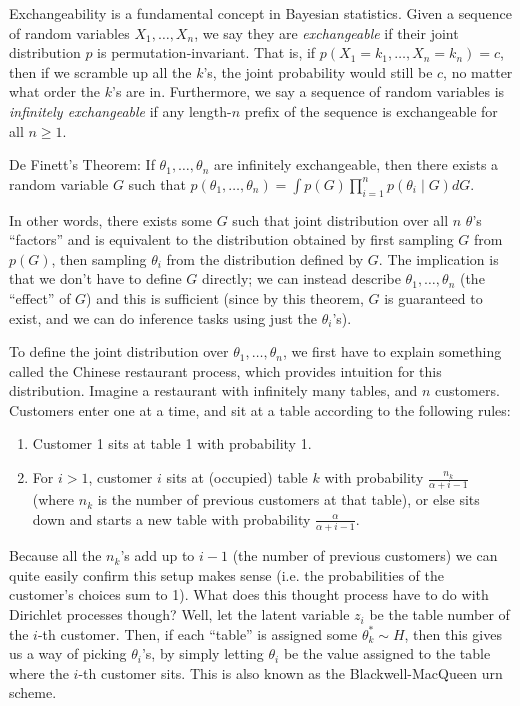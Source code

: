 Exchangeability is a fundamental concept in Bayesian statistics. Given a sequence of random variables $X_1, \ldots, X_n$, we say they are \textit{exchangeable} if their joint distribution $p$ is permutation-invariant. That is, if $p(X_1 = k_1, \ldots, X_n = k_n) = c$, then if we scramble up all the $k$'s, the joint probability would still be $c$, no matter what order the $k$'s are in. Furthermore, we say a sequence of random variables is \textit{infinitely exchangeable} if any length-$n$ prefix of the sequence is exchangeable for all $n \geq 1$.

\begin{theorem}
De Finett's Theorem: If $\theta_1, \ldots, \theta_n$ are infinitely exchangeable, then there exists a random variable $G$ such that $p(\theta_1, \ldots, \theta_n) = \int\limits p(G) \prod\limits_{i = 1}^n p(\theta_i \mid G) dG$.
\end{theorem}

In other words, there exists some $G$ such that joint distribution over all $n$ $\theta$'s ``factors'' and is equivalent to the distribution obtained by first sampling $G$ from $p(G)$, then sampling $\theta_i$ from the distribution defined by $G$. The implication is that we don't have to define $G$ directly; we can instead describe $\theta_1, \ldots, \theta_n$ (the ``effect'' of $G$) and this is sufficient (since by this theorem, $G$ is guaranteed to exist, and we can do inference tasks using just the $\theta_i$'s).

To define the joint distribution over $\theta_1, \ldots, \theta_n$, we first have to explain something called the Chinese restaurant process, which provides intuition for this distribution. Imagine a restaurant with infinitely many tables, and $n$ customers. Customers enter one at a time, and sit at a table according to the following rules:

\begin{enumerate}
\item Customer 1 sits at table 1 with probability 1.
\item For $i > 1$, customer $i$ sits at (occupied) table $k$ with probability $\frac{n_k}{\alpha + i - 1}$ (where $n_k$ is the number of previous customers at that table), or else sits down and starts a new table with probability $\frac{\alpha}{\alpha + i - 1}$. 
\end{enumerate}

Because all the $n_k$'s add up to $i - 1$ (the number of previous customers) we can quite easily confirm this setup makes sense (i.e. the probabilities of the customer's choices sum to 1). What does this thought process have to do with Dirichlet processes though? Well, let the latent variable $z_i$ be the table number of the $i$-th customer. Then, if each ``table'' is assigned some $\theta_k^* \sim H$, then this gives us a way of picking $\theta_i$'s, by simply letting $\theta_i$ be the value assigned to the table where the $i$-th customer sits. This is also known as the Blackwell-MacQueen urn scheme.

